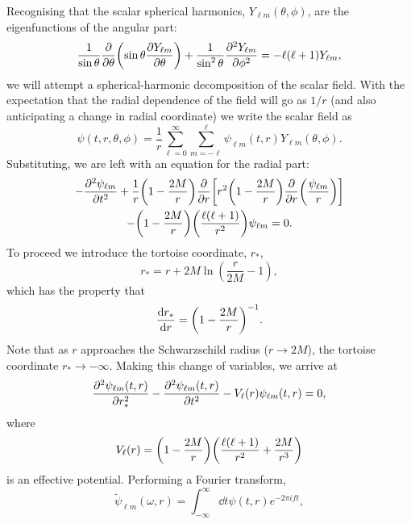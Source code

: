 Recognising that the scalar spherical harmonics, $Y_{\ell m}(\theta,\phi)$, are the eigenfunctions of the angular part:
\begin{equation}\label{ch1:eq:spherical}
    \frac{1}{\sin{\theta}} \pdv{\theta} \qty(\sin{\theta} \pdv{Y_{\ell m}}{\theta} ) + \frac{1}{\sin^2{\theta}} \pdv[2]{Y_{\ell m}}{\phi} = - \ell (\ell + 1) Y_{\ell m},
\end{equation}
we will attempt a spherical-harmonic decomposition of the scalar field. 
With the expectation that the radial dependence of the field will go as $1/r$ (and also anticipating a change in radial coordinate) we write the scalar field as
\begin{equation}\label{ch1:eq:scalar_spherical_expansion}
    \psi(t, r, \theta, \phi) = \frac{1}{r} \sum_{\ell = 0}^\infty \sum_{m = -\ell}^\ell \psi_{\ell m}(t, r) Y_{\ell m}(\theta, \phi).
\end{equation}
Substituting, we are left with an equation for the radial part:
\begin{multline}
    - \pdv[2]{\psi_{\ell m}}{t} + \frac{1}{r} \qty(1 - \frac{2M}{r}) \pdv{r} \qty[r^2 \qty(1 - \frac{2M}{r}) \pdv{r}\qty(\frac{\psi_{\ell m}}{r}) ]\\
    - \qty(1 - \frac{2M}{r}) \qty(\frac{\ell (\ell + 1)}{r^2}) \psi_{\ell m} = 0.
\end{multline}
To proceed we introduce the tortoise coordinate, $r_*$,
\begin{equation}
    r_* = r + 2M \ln(\frac{r}{2M} - 1),
\end{equation}
which has the property that
\begin{equation}
    \dv{r_*}{r} = \qty( 1 - \frac{2M}{r} )^{-1}.
\end{equation}
Note that as $r$ approaches the Schwarzschild radius ($r \rightarrow 2M$), the tortoise coordinate $r_* \rightarrow -\infty$.
Making this change of variables, we arrive at
\begin{equation}\label{ch1:eq:wave_equation}
    \pdv[2]{\psi_{\ell m}(t,r)}{r_*} - \pdv[2]{\psi_{\ell m}(t,r)}{t} - V_\ell(r) \psi_{\ell m}(t,r) = 0,
\end{equation}
where
\begin{equation}
    V_\ell(r) = \qty( 1 - \frac{2M}{r} ) \qty( \frac{\ell (\ell + 1)}{r^2} + \frac{2M}{r^3} )
\end{equation}
is an effective potential.
Performing a Fourier transform, 
\begin{equation}\label{ch1:eq:ft}
    \tilde{\psi}_{\ell m}(\omega,r) = \int_{-\infty}^\infty \dd{t} \psi(t,r) e^{-2\pi i f t},
\end{equation}
